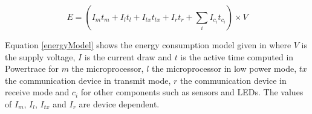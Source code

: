 \begin{equation}
E = (I_{m}t_{m} + I_{l}t_{l} + I_{tx}t_{tx} + I_{r}t_{r} +  \sum_{i}I_{c_{i}}t_{c_{i}}) \times{V}
\label{energyModel}
\end{equation}


Equation \ref{energyModel} shows the energy consumption model given in \cite{dunkels2007software} 
where $V$ is the supply voltage, $I$ is the current draw and $t$ is the active time computed in Powertrace for $m$ the microprocessor, $l$ the microprocessor in low power mode, $tx$ the communication device in transmit mode, $r$ the communication device in receive mode and $c_{i}$ for other components such as sensors and LEDs. The values of $I_{m}$, $I_{l}$, $I_{tx}$ and $I_{r}$ are device dependent. 




